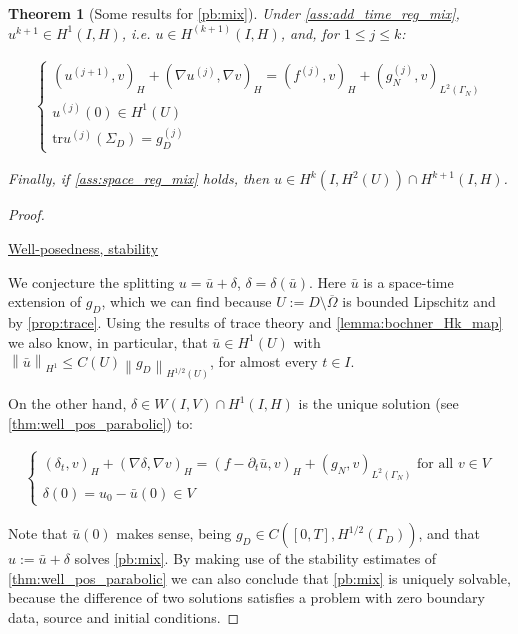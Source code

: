 \documentclass[english,a4paper,10pt,oneside]{scrbook}	%
\theoremstyle{break}
\newtheorem{thm}[equation]{Theorem}
\newenvironment{mproof}[1][\proofname]{%
  \begin{proof}[#1]$ $\par\nobreak\ignorespaces
}{%
  \end{proof}
}
\renewcommand*{\proofname}{Proof}
\theoremstyle{remark}
\newcommand{\norm}[1]{\left\lVert#1\right\rVert}
\newcommand{\tr}{\text{tr}}
\begin{document}
\begin{appendices}
\begin{thm}[Some results for \cref{pb:mix}]


Under \cref{ass:add_time_reg_mix}, $u^{k+1} \in H^1(I,H)$, i.e. $u \in H^{(k+1)}(I,H)$, and, for $1\leq j \leq k$:

\begin{align*}
	\left\{\begin{matrix}
(u^{(j+1)},v)_H + (\nabla u^{(j)}, \nabla v)_H = ( f^{(j)}, v)_H + (g_N^{(j)}, v)_{L^2(\Gamma_N)} \\
u^{(j)}(0)  \in H^1(U) \\
\tr u^{(j)}(\Sigma_D) = g_D^{(j)}
\end{matrix}\right.
\end{align*}


Finally, if \cref{ass:space_reg_mix} holds, then $u \in H^{k}(I,H^2(U)) \cap H^{k+1}(I,H)$.

\end{thm}

\begin{mproof}

\underline{Well-posedness, stability}

We conjecture the splitting $u=\bar{u} + \delta$, $\delta = \delta (\bar{u})$. Here $\bar{u}$ is a space-time extension of $g_D$, which we can find because $U:=D\setminus \overline{\Omega}$ is bounded Lipschitz and by \cref{prop:trace}.
Using the results of trace theory and \cref{lemma:bochner_Hk_map} we also know, in particular, that $\bar{u} \in H^1(U)$ with $\norm{\bar{u}}_{H^1}\leq C(U) \norm{g_D}_{H^{1/2}(U)}$, for almost every $t \in I$.

On the other hand, $\delta \in W(I,V) \cap H^1(I,H)$ is the unique solution (see \cref{thm:well_pos_parabolic}) to:

\begin{align}
\label{pb:diri_ext}
\left\{\begin{matrix}
(\delta_t,v)_H + (\nabla \delta, \nabla v)_H = (f - \partial_t \bar{u},v)_H + (g_N,v)_{L^2(\Gamma_N)} \text{ for all } v \in V\\ 
\delta(0) = u_0 - \bar{u}(0) \in V
\end{matrix}\right.
\end{align}

Note that $\bar{u}(0)$ makes sense, being $g_D \in C([0,T], H^{1/2}(\Gamma_D))$, and that $u:=\bar{u} + \delta$ solves \cref{pb:mix}. By making use of the stability estimates of \cref{thm:well_pos_parabolic} we can also conclude that \cref{pb:mix} is uniquely solvable, because the difference of two solutions satisfies a problem with zero boundary data, source and initial conditions.


\end{mproof}
\end{appendices}
\end{document}
